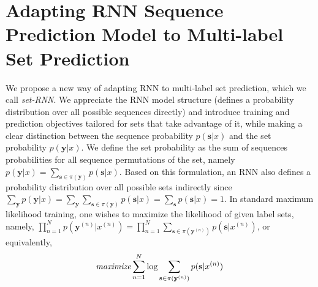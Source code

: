 
\section{Adapting RNN Sequence Prediction Model to Multi-label Set Prediction}
\label{sec:Model}

We propose a new way of adapting RNN to multi-label set prediction, which we call \emph{set-RNN}. We appreciate the RNN model structure (defines a probability distribution over all possible sequences directly) and introduce training and prediction objectives tailored for sets that take advantage of it, while making a clear distinction between the sequence probability $p(\mathbf{s}|x)$ and the set probability $p(\mathbf{y}|x)$. 
  We define the set probability as the sum of sequences probabilities for all sequence permutations of the set, namely $p(\mathbf{y}|x)=\sum_{\mathbf{s}\in \pi(\mathbf{y})} p(\mathbf{s}|x)$. Based on this formulation, an RNN also defines a probability distribution over all possible sets indirectly since $\sum_{\mathbf{y}} p(\mathbf{y}|x)=\sum_{\mathbf{y}}\sum_{\mathbf{s}\in \pi(\mathbf{y})} p(\mathbf{s}|x)=\sum_{\mathbf{s}} p(\mathbf{s}|x)=1$.  In standard maximum likelihood training, one wishes to maximize the likelihood of given label sets, namely, $\prod_{n=1}^N p(\mathbf{y}^{(n)}|x^{(n)})=\prod_{n=1}^N \sum_{\mathbf{s}\in \pi(\mathbf{y}^{(n)})} p(\mathbf{s}|x^{(n)})$, or equivalently, 
\begin{align}
\textit{maximize} \sum_{n=1}^N \log \sum_{\mathbf{s}\in \pi(\mathbf{y}^{(n)})} p(\mathbf{s}|x^{(n)})
\label{eq:right_obj}
\end{align}

